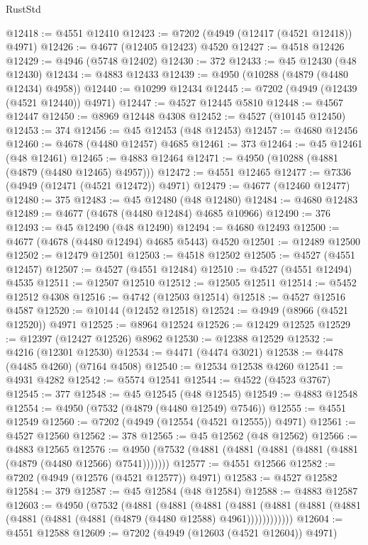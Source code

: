 \begin{lexlean}{RustStd}
\begin{coremodule}
@12418 := @4551 @12410
@12423 := @7202 (@4949 (@12417 (@4521 @12418)) @4971)
@12426 := @4677 (@12405 @12423) @4520
@12427 := @4518 @12426
@12429 := @4946 (@5748 @12402)
@12430 := 372
@12433 := @45 @12430 (@48 @12430)
@12434 := @4883 @12433
@12439 := @4950 (@10288 (@4879 (@4480 @12434) @4958))
@12440 := @10299 @12434
@12445 := @7202 (@4949 (@12439 (@4521 @12440)) @4971)
@12447 := @4527 @12445 @5810
@12448 := @4567 @12447
@12450 := @8969 @12448 @4308
@12452 := @4527 (@10145 @12450)
@12453 := 374
@12456 := @45 @12453 (@48 @12453)
@12457 := @4680 @12456
@12460 := @4678 (@4480 @12457) @4685
@12461 := 373
@12464 := @45 @12461 (@48 @12461)
@12465 := @4883 @12464
@12471 := @4950 (@10288 (@4881 (@4879 (@4480 @12465) @4957)))
@12472 := @4551 @12465
@12477 := @7336 (@4949 (@12471 (@4521 @12472)) @4971)
@12479 := @4677 (@12460 @12477)
@12480 := 375
@12483 := @45 @12480 (@48 @12480)
@12484 := @4680 @12483
@12489 := @4677 (@4678 (@4480 @12484) @4685 @10966)
@12490 := 376
@12493 := @45 @12490 (@48 @12490)
@12494 := @4680 @12493
@12500 := @4677 (@4678 (@4480 @12494) @4685 @5443) @4520
@12501 := @12489 @12500
@12502 := @12479 @12501
@12503 := @4518 @12502
@12505 := @4527 (@4551 @12457)
@12507 := @4527 (@4551 @12484)
@12510 := @4527 (@4551 @12494) @4535
@12511 := @12507 @12510
@12512 := @12505 @12511
@12514 := @5452 @12512 @4308
@12516 := @4742 (@12503 @12514)
@12518 := @4527 @12516 @4587
@12520 := @10144 (@12452 @12518)
@12524 := @4949 (@8966 (@4521 @12520)) @4971
@12525 := @8964 @12524
@12526 := @12429 @12525
@12529 := @12397 (@12427 @12526) @8962
@12530 := @12388 @12529
@12532 := @4216 (@12301 @12530)
@12534 := @4471 (@4474 @3021)
@12538 := @4478 (@4485 @4260) (@7164 @4508)
@12540 := @12534 @12538 @4260
@12541 := @4931 @4282
@12542 := @5574 @12541
@12544 := @4522 (@4523 @3767)
@12545 := 377
@12548 := @45 @12545 (@48 @12545)
@12549 := @4883 @12548
@12554 := @4950 (@7532 (@4879 (@4480 @12549) @7546))
@12555 := @4551 @12549
@12560 := @7202 (@4949 (@12554 (@4521 @12555)) @4971)
@12561 := @4527 @12560
@12562 := 378
@12565 := @45 @12562 (@48 @12562)
@12566 := @4883 @12565
@12576 := @4950 (@7532 (@4881 (@4881 (@4881 (@4881 (@4881 (@4879 (@4480 @12566) @7541)))))))
@12577 := @4551 @12566
@12582 := @7202 (@4949 (@12576 (@4521 @12577)) @4971)
@12583 := @4527 @12582
@12584 := 379
@12587 := @45 @12584 (@48 @12584)
@12588 := @4883 @12587
@12603 := @4950
    (@7532
      (@4881
        (@4881
          (@4881
            (@4881 (@4881 (@4881 (@4881 (@4881 (@4881 (@4881 (@4879 (@4480 @12588) @4961))))))))))))
@12604 := @4551 @12588
@12609 := @7202 (@4949 (@12603 (@4521 @12604)) @4971)

\end{coremodule}
\end{lexlean}

